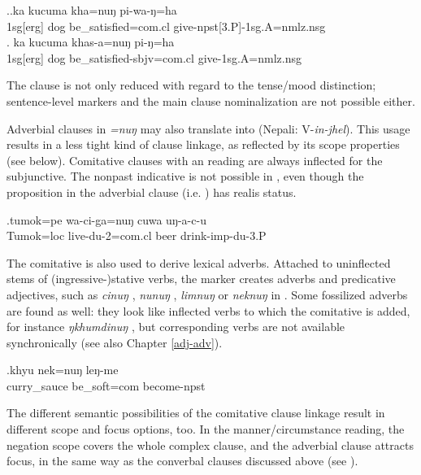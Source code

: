 \ex.\ag.ka kucuma kha=nuŋ pi-wa-ŋ=ha\\
{\sc 1sg[erg]} dog   be\_satisfied{\sc [sbjv;3sg]=com.cl} give{\sc -npst[3.P]-1sg.A=nmlz.nsg}\\
\bg. ka kucuma khas-a=nuŋ pi-ŋ=ha\\
{\sc 1sg[erg]} dog   be\_satisfied{\sc [3sg]-sbjv=com.cl} give{\sc [pst;3.P]-1sg.A=nmlz.nsg}\\

The clause is not only reduced with regard to the tense/mood distinction; sentence-level markers and the main clause nominalization are not possible either. 

Adverbial clauses in \emph{=nuŋ} may also  translate into  (Nepali: V-\emph{in-jhel}). This usage results in a less tight kind of clause linkage, as reflected by its scope properties (see below). Comitative clauses with an  reading are always inflected for the subjunctive. The nonpast indicative is not possible in \Next, even though the proposition in the adverbial clause (i.e. ) has realis status.%

\exg.\label{ex-nung}tumok=pe wa-ci-ga=nuŋ cuwa uŋ-a-c-u\\
Tumok{\sc =loc} live{\sc [sbjv]-du-2=com.cl} beer    drink{\sc -imp-du-3.P}\\


The comitative is also used to derive lexical adverbs. Attached to uninflected stems of (ingressive-)stative verbs, the marker creates adverbs and predicative adjectives, such as \emph{cinuŋ} , \emph{nunuŋ} , \emph{limnuŋ}  or \emph{neknuŋ}  in \Next.  Some fossilized adverbs are found as well: they look like inflected verbs to which the comitative is added, for instance \emph{ŋkhumdinuŋ} , but corresponding verbs are not available synchronically (see also Chapter \ref{adj-adv}).
 
\exg.khyu  nek=nuŋ leŋ-me\\
curry\_sauce    be\_soft{\sc =com} become{\sc [3sg]-npst}\\
 


The different semantic possibilities of the comitative clause linkage result in different scope and focus options, too. In the manner/circumstance reading, the negation scope covers the whole complex clause, and the adverbial clause attracts focus, in the same way as the  converbal clauses discussed above (see \Next[a]). 

